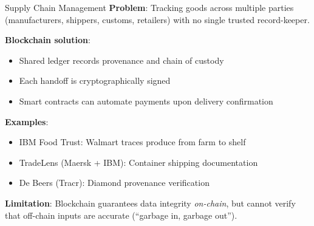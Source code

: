 \documentclass[10pt]{beamer}
\begin{document}
\begin{frame}{Supply Chain Management}
  \textbf{Problem}: Tracking goods across multiple parties (manufacturers, shippers, customs, retailers) with no single trusted record-keeper.
  
  \vspace{1em}
  \textbf{Blockchain solution}:
  \begin{itemize}
    \item Shared ledger records provenance and chain of custody
    \item Each handoff is cryptographically signed
    \item Smart contracts can automate payments upon delivery confirmation
  \end{itemize}
  
  \vspace{1em}
  \textbf{Examples}:
  \begin{itemize}
    \item IBM Food Trust: Walmart traces produce from farm to shelf
    \item TradeLens (Maersk + IBM): Container shipping documentation
    \item De Beers (Tracr): Diamond provenance verification
  \end{itemize}
  
  \vspace{1em}
  \textbf{Limitation}: Blockchain guarantees data integrity \textit{on-chain}, but cannot verify that off-chain inputs are accurate (``garbage in, garbage out'').
\end{frame}
\end{document}
